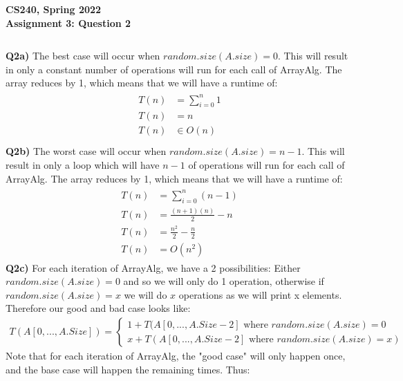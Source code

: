\documentclass[12pt]{article}
\begin{document}
\begin{center}
{\Large\textbf{CS240, Spring 2022}}\\
\vspace{2mm}
{\Large\textbf{Assignment 3: Question 2}}\\
\vspace{3mm}
\end{center}
\[ \]
\begin{adjustwidth}{0em}{0pt}
\textbf{Q2a)} The best case will occur when $random.size(A.size) = 0$. This will result in only a constant number of operations will run for each call of ArrayAlg. The array reduces by 1, which means that we will have a runtime of:
\begin{align*}
    \begin{aligned}
       T(n) &= \sum^{n}_{i=0}1 \\
       T(n) &= n \\
       T(n) &\in O(n)  \\
    \end{aligned}
\end{align*}
\textbf{Q2b)} The worst case will occur when $random.size(A.size) = n-1$. This will result in only a loop which will have $n-1$ of operations will run for each call of ArrayAlg. The array reduces by 1, which means that we will have a runtime of:
\begin{align*}
    \begin{aligned}
       T(n) &= \sum^{n}_{i=0}(n-1) \\
       T(n) &= \frac{(n+1)(n)}{2} -n \\
       T(n) &= \frac{n^2}{2} - \frac{n}{2} \\
       T(n) &= O(n^2)
    \end{aligned}
\end{align*}
\textbf{Q2c)} For each iteration of ArrayAlg, we have a 2 possibilities: Either $random.size(A.size) = 0$ and so we will only do 1 operation, otherwise if $random.size(A.size) = x$ we will do $x$ operations as we will print x elements. Therefore our good and bad case looks like:
\begin{align*}
    T(A[0,...,A.Size]) = \begin{cases}
       1 + T(A[0,...,A.Size-2] \text{ where $random.size(A.size) = 0$} \\
       x + T(A[0,...,A.Size-2] \text{ where $random.size(A.size) = x$})
    \end{cases}
\end{align*}
Note that for each iteration of ArrayAlg, the "good case" will only happen once, and the base case will happen the remaining times. Thus:

\end{adjustwidth}
\end{document}
